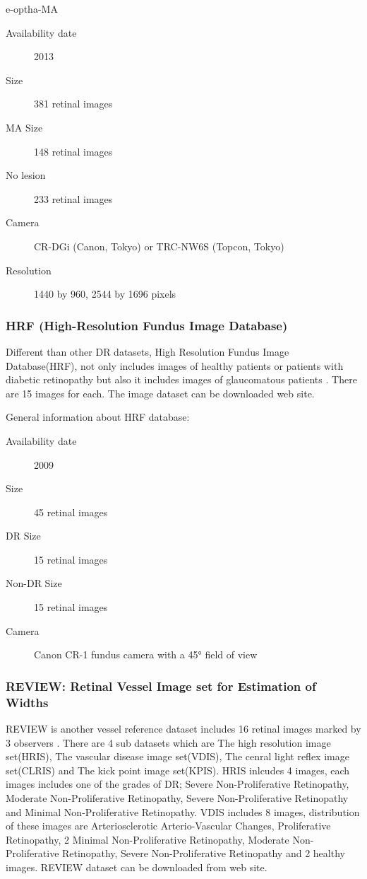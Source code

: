 e-optha-MA
\begin{description}
    \item[Availability date] 2013
    \item[Size] 381 retinal images
    \item[MA Size] 148 retinal images
    \item[No lesion] 233 retinal images
    \item[Camera] CR-DGi (Canon, Tokyo) or TRC-NW6S (Topcon, Tokyo) 
    \item[Resolution] 1440 by 960, 2544 by 1696 pixels
\end{description}


\subsubsection{HRF (High-Resolution Fundus Image Database)}
Different than other DR datasets, High Resolution Fundus Image Database(HRF), not only includes images of healthy patients or patients with diabetic retinopathy but also it includes images of glaucomatous patients \citep{budai2009multiscale}. There are 15 images for each. The image dataset can be downloaded \citet{HRF-DB} web site.


General information about HRF database:
\begin{description}
    \item[Availability date] 2009
    \item[Size] 45 retinal images
    \item[DR Size] 15 retinal images
    \item[Non-DR Size] 15 retinal images
    \item[Camera] Canon CR-1 fundus camera with a 45° field of view
\end{description}

\subsubsection{REVIEW: Retinal Vessel Image set for Estimation of Widths}

REVIEW is another vessel reference dataset includes 16 retinal images marked by 3 observers \citep{al2008review}. There are 4 sub datasets which are The high resolution image set(HRIS), The vascular disease image set(VDIS), The cenral light reflex image set(CLRIS) and The kick point image set(KPIS). 
HRIS inlcudes 4 images, each images includes one of the grades of DR; Severe Non-Proliferative Retinopathy, Moderate Non-Proliferative Retinopathy, Severe Non-Proliferative Retinopathy and Minimal Non-Proliferative Retinopathy. VDIS includes 8 images, distribution of these images are Arteriosclerotic Arterio-Vascular Changes, Proliferative Retinopathy, 2 Minimal Non-Proliferative Retinopathy, Moderate Non-Proliferative Retinopathy, Severe Non-Proliferative Retinopathy and 2 healthy images. REVIEW dataset can be downloaded from \citet{REVIEWDB} web site.


